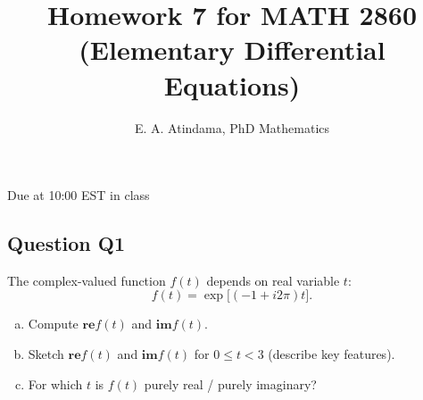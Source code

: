 \documentclass[a4paper,11pt,reqno]{amsart}
\title[MATH 2860 (Elementary Differential Equations)]{Homework 7 for MATH 2860 (Elementary Differential Equations)}
\author[Emmanuel Atindama]{E. A. Atindama, PhD Mathematics}
\numberwithin{equation}{section}
\renewcommand{\Re}{\mathbf{re}}
\renewcommand{\Im}{\mathbf{im}}
\begin{document}
\maketitle

Due at 10:00 EST in class


\subsection*{Question Q1}
The complex-valued function \(f(t)\) depends on real variable \(t\):
\[
f(t)=\exp\big[(-1+i2\pi)t\big].
\]
\begin{enumerate}[(a)]
  \item Compute \(\Re f(t)\) and \(\Im f(t)\).
  \item Sketch \(\Re f(t)\) and \(\Im f(t)\) for \(0\le t<3\) (describe key features).
  \item For which \(t\) is \(f(t)\) purely real / purely imaginary?
\end{enumerate}
\end{document}
